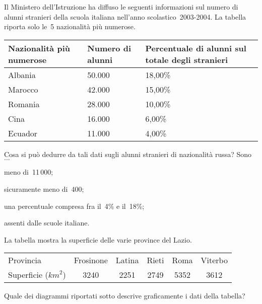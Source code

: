 \begin{esercizio}
\label{ese:A.58}
Il Ministero dell'Istruzione ha diffuso le seguenti informazioni sul numero 
di alunni stranieri della scuola italiana
nell'anno scolastico~2003-2004. La tabella riporta solo le~5 nazionalità 
più numerose.
\begin{center}
 \begin{tabularx}{.9\textwidth}{*{3}{X}}
\toprule
Nazionalità più numerose & Numero di alunni & Percentuale di alunni sul 
totale degli stranieri \\
\midrule
Albania & 50.000 & 18,00\% \\
Marocco & 42.000 & 15,00\% \\
Romania & 28.000 & 10,00\% \\
Cina & 16.000 & 6,00\% \\
Ecuador & 11.000 & 4,00\% \\
\bottomrule
\end{tabularx}
\end{center}

Cosa si può dedurre da tali dati sugli alunni stranieri di nazionalità 
russa? Sono~$\ldots$
\begin{enumeratea}
 \item meno di~11\,000;
 \item sicuramente meno di~400;
 \item una percentuale compresa fra il~4\% e il~18\%;
 \item assenti dalle scuole italiane.
\end{enumeratea}
\end{esercizio}
\begin{esercizio}
\label{ese:A.59}
La tabella mostra la superficie delle varie province del Lazio.
\begin{center}
 \begin{tabular}{l*{5}{c}}
 \toprule
 Provincia & Frosinone & Latina & Rieti & Roma & Viterbo\\
 Superficie ($\unit{km}^2$) & 3240& 2251& 2749& 5352& 3612\\
 \bottomrule
 \end{tabular}
\end{center}
Quale dei diagrammi riportati sotto descrive graficamente i dati della 
tabella?
\begin{center}
 
\end{center}

\end{esercizio}

